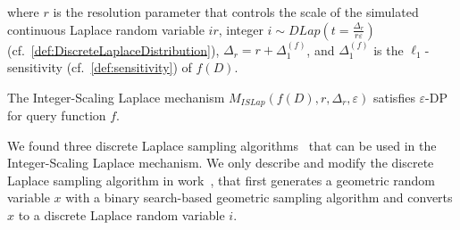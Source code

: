 where $r$ is the resolution parameter that controls the scale of the simulated continuous Laplace random variable $ir$, integer $i \sim DLap\left(t=\frac{\Delta_r}{r\varepsilon}\right) $ (cf.~\autoref{def:DiscreteLaplaceDistribution}), $\Delta _r=r+\Delta^{\left(f\right) }_1$, and $\Delta^{\left(f\right) }_1$ is the $\ell_1$-sensitivity (cf.~\autoref{def:sensitivity}) of $f\left(D\right)$.

\begin{theorem}
    The Integer-Scaling Laplace mechanism $M_{ISLap}\left(f\left(D\right),r,\Delta _r,\varepsilon\right)$ satisfies $\varepsilon$-DP for query function $f$.
\end{theorem}

We found three discrete Laplace sampling algorithms~\cite{eigner2014differentially,googleDP2019,canonne2020discrete } that can be used in the Integer-Scaling Laplace mechanism.
We only describe and modify the discrete Laplace sampling algorithm in work~\cite{googleDP2019}, that first generates a geometric random variable $x$ with a binary search-based geometric sampling algorithm and converts $x$ to a discrete Laplace random variable $i$.






